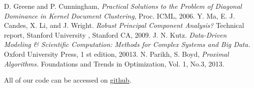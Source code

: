 \documentclass[12pt]{article}
\begin{document}
\begin{thebibliography}{4}
 D. Greene and P. Cunningham, \emph{Practical Solutions to the Problem of Diagonal Dominance in Kernel Document Clustering}, Proc. ICML, 2006.
 Y. Ma, E. J. Candes, X. Li, and J. Wright. \emph{Robust Principal Component Analysis?} Technical report, Stanford University , Stanford CA, 2009.
 J. N. Kutz. \emph{Data-Driven Modeling \& Scientific Computation: Methods for Complex Systems and Big Data.} Oxford University Press, 1 st edition, 20013.
 N. Parikh, S. Boyd, \emph{Proximal Algorithms.} Foundations and Trends in Optimization, Vol. 1, No.3, 2013.
\end{thebibliography}

\vspace{5ex}
All of our code can be accessed on {\color{blue}\href{https://github.com/kels271828/582FinalProject.git}{github}}.
\end{document}

